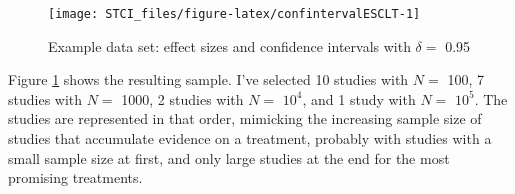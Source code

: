 \documentclass[]{book}
\newenvironment{Shaded}{\begin{snugshade}}{\end{snugshade}}
\newcommand{\DataTypeTok}[1]{\textcolor[rgb]{0.13,0.29,0.53}{#1}}
\newcommand{\DecValTok}[1]{\textcolor[rgb]{0.00,0.00,0.81}{#1}}
\newcommand{\FloatTok}[1]{\textcolor[rgb]{0.00,0.00,0.81}{#1}}
\newcommand{\KeywordTok}[1]{\textcolor[rgb]{0.13,0.29,0.53}{\textbf{#1}}}
\newcommand{\NormalTok}[1]{#1}
\newcommand{\OperatorTok}[1]{\textcolor[rgb]{0.81,0.36,0.00}{\textbf{#1}}}
\newcommand{\StringTok}[1]{\textcolor[rgb]{0.31,0.60,0.02}{#1}}
\theoremstyle{definition}
\theoremstyle{definition}
\theoremstyle{definition}
\theoremstyle{remark}
\begin{document}
\begin{Shaded}
\end{Shaded}

\begin{figure}[htbp]

{\centering \texttt{[image: STCI\_files/figure-latex/confintervalESCLT-1]} 

}

\caption{Example data set: effect sizes and confidence intervals with $\delta=$ 0.95}\label{fig:confintervalESCLT}
\end{figure}

Figure \ref{fig:confintervalESCLT} shows the resulting sample.
I've selected 10 studies with \(N=\) 100, 7 studies with \(N=\) 1000, 2 studies with \(N=\) \ensuremath{10^{4}}, and 1 study with \(N=\) \ensuremath{10^{5}}.
The studies are represented in that order, mimicking the increasing sample size of studies that accumulate evidence on a treatment, probably with studies with a small sample size at first, and only large studies at the end for the most promising treatments.
\end{document}
